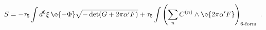 \begin{equation}
\label{D5action}
  S = - \tau_5 \int d^6 \xi\, \e{-\Phi} \sqrt{-\det(G+2\pi\alpha' F)} 
  + \tau_5 \int \left( \sum\limits_n C^{(n)} \wedge
  \e{2\pi\alpha' F} \right)_{\text{6-form}}~.
\end{equation}

